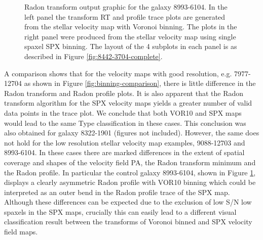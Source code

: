 \begin{figure}
    \caption{Radon transform output graphic for the galaxy 8993-6104. In the left panel the transform RT and profile trace plots are generated from the stellar velocity map with Voronoi binning. The plots in the right panel were produced from the stellar velocity map using single spaxel SPX binning. The layout of the 4 subplots in each panel is as described in Figure \ref{fig:8442-3704-complete}.}
    \label{fig:binning-comparison2}
\end{figure}

A comparison shows that for the velocity maps with good resolution, e.g. 7977-12704 as shown in Figure \ref{fig:binning-comparison},  there is little difference in the Radon transform and Radon profile plots. It is also apparent that the Radon transform algorithm for the SPX velocity maps yields a greater number of valid data points in the trace plot. We conclude that both VOR10 and SPX maps would lead to the same Type classification in these cases. This conclusion was also obtained for galaxy 8322-1901 (figures not included).  However, the same does not hold for the low resolution stellar velocity map examples, 9088-12703 and 8993-6104. In these cases there are marked differences in the extent of spatial coverage and shapes of the velocity field PA, the Radon transform minimum and the Radon profile. In particular the control galaxy 8993-6104, shown in Figure \ref{fig:binning-comparison2}, displays a clearly asymmetric Radon profile with VOR10 binning which could be interpreted as an outer bend in the Radon profile trace of the SPX map. Although these differences can be expected due to the exclusion of low S/N low spaxels in the SPX maps, crucially this can easily lead to a different visual classification result between the transforms of Voronoi binned and SPX velocity field maps.    